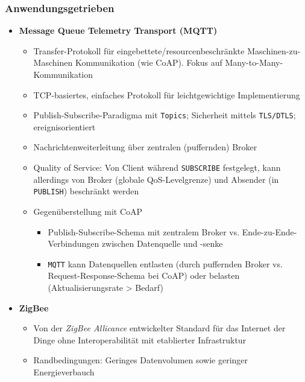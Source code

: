 \subsubsection{Anwendungsgetrieben}
\begin{itemize}
	\item \textbf{Message Queue Telemetry Transport (MQTT)}
	\begin{itemize}
		\item Transfer-Protokoll für eingebettete/resourcenbeschränkte Maschinen-zu-Maschinen Kommunikation (wie CoAP). Fokus auf Many-to-Many-Kommunikation
		\item TCP-basiertes, einfaches Protokoll für leichtgewichtige Implementierung
		\item Publish-Subscribe-Paradigma mit \texttt{Topics}; Sicherheit mittels \texttt{TLS/DTLS}; ereignisorientiert
		\item Nachrichtenweiterleitung über zentralen (puffernden) Broker
		\item Quality of Service: Von Client während \texttt{SUBSCRIBE} festgelegt, kann allerdings von Broker (globale QoS-Levelgrenze) und Absender (in \texttt{PUBLISH}) beschränkt werden
		\item Gegenüberstellung mit CoAP
		\begin{itemize}
			\item Publish-Subscribe-Schema mit zentralem Broker vs. Ende-zu-Ende-Verbindungen zwischen Datenquelle und -senke
			\item \texttt{MQTT} kann Datenquellen entlasten (durch puffernden Broker vs. Request-Response-Schema bei CoAP) oder belasten (Aktualisierungsrate > Bedarf)
		\end{itemize}
	\end{itemize}
	\item \textbf{ZigBee}
	\begin{itemize}
		\item Von der \textit{ZigBee Allicance} entwickelter Standard für das Internet der Dinge ohne Interoperabilität mit etablierter Infrastruktur
		\item Randbedingungen: Geringes Datenvolumen sowie geringer Energieverbauch

\end{itemize}
\end{itemize}
